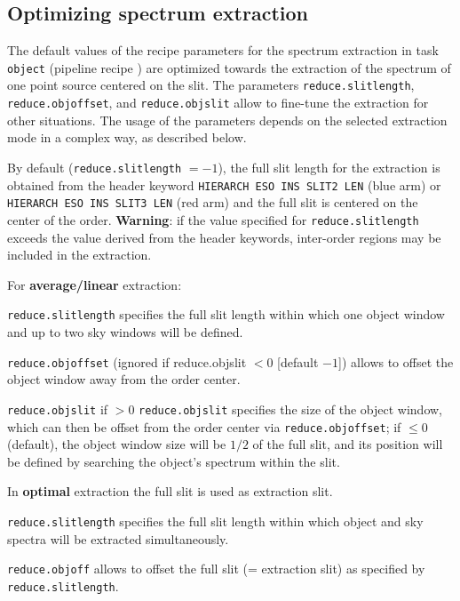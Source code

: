 \subsection{Optimizing spectrum extraction}
\label{sect:optimizing_extraction}

The default values of the recipe parameters for the spectrum extraction in task {\tt object}
(pipeline recipe ) 
are optimized towards the extraction of the spectrum of 
one point source centered on the slit. 
The parameters {\tt reduce.slitlength}, {\tt reduce.objoffset}, and
{\tt reduce.objslit} allow to fine-tune the extraction for other situations. The usage of the 
parameters depends on the selected extraction mode in a complex way, as described below.

By default ({\tt reduce.slitlength} $= -1$), the full slit length for the extraction is obtained 
from the header
keyword {\tt HIERARCH ESO INS SLIT2 LEN} (blue arm) or {\tt HIERARCH ESO INS SLIT3 LEN} (red arm)
and the full slit is centered on the center of the order.\newline 
\textbf{Warning}: if the value specified for {\tt reduce.slitlength}
exceeds the value derived from the header keywords,
inter-order regions may be included in the extraction.

For \textbf{average/linear} extraction: 

{\tt reduce.slitlength} specifies the full slit length within which one object window 
and up to two sky windows will be defined.

{\tt reduce.objoffset} (ignored if reduce.objslit $<0$ [default $-1$]) allows to offset the 
object window away from the order center.

{\tt reduce.objslit} if $>0$ {\tt reduce.objslit} specifies the size of the object window, 
which can then be
offset from the order center via {\tt reduce.objoffset}; if $\le 0$ (default), 
the object window size will be $1/2$ of the full slit, 
and its position will be defined by searching the object’s spectrum within the slit.

In \textbf{optimal} extraction the full slit is used as extraction slit.

{\tt reduce.slitlength} specifies the full slit length within which object 
and sky spectra will be extracted simultaneously.

{\tt reduce.objoff} allows to offset the full slit (= extraction slit) as specified by
{\tt reduce.slitlength}.

